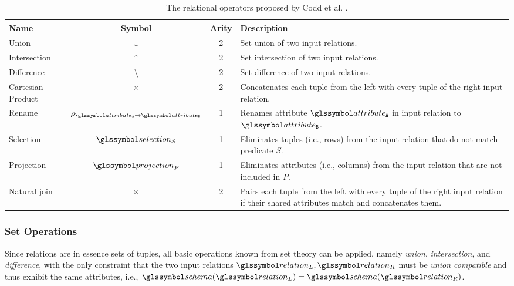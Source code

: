 \begin{table}
    \caption{The relational operators proposed by Codd et al. \cite{Codd:1970Relational,Garcia:2009Database}.}
    \label{table:relational_operators}
    \begin{tabular}{| l | c | c | p{80mm} |}
        \hline
       \textbf{Name} & \textbf{Symbol} & \textbf{Arity}  & \textbf{Description} \\ 
        \hline
        \hline
        Union & $\cup$  & 2 & Set union of two input relations. \\
        \hline
        Intersection & $\cap$  & 2 & Set intersection of two input relations. \\
        \hline
        Difference & $\setminus$  & 2 & Set difference of two input relations. \\
        \hline
        Cartesian Product & $\times$ & 2 & Concatenates each tuple from the left with every tuple of the right input relation. \\
        \hline
        Rename & $\rho_{\attribute_\mathtt{A} \rightarrow \attribute_\mathtt{B}}$ &  1 & Renames attribute $\attribute_\mathtt{A}$ in input relation to $\attribute_\mathtt{B}$. \\
        \hline
        Selection & $\selection_{S}$ &  1 & Eliminates tuples (i.e., rows) from the input relation that do not match predicate $S$. \\
        \hline
        Projection & $\projection_{P}$ &  1 & Eliminates attributes (i.e., columns) from the input relation that are not included in $P$. \\
        \hline
        Natural join & $\Join$ & 2 & Pairs each tuple from the left with every tuple of the right input relation if their shared attributes match and concatenates them. \\
        \hline
    \end{tabular}
\end{table}

\subsubsection{Set Operations}

Since relations are in essence sets of tuples, all basic operations known from set theory can be applied, namely \emph{union}, \emph{intersection}, and \emph{difference}, with the only constraint that the two input relations $\relation_L,\relation_R$ must be \emph{union compatible} and thus exhibit the same attributes, i.e., $\schema(\relation_L) = \schema(\relation_R)$.

